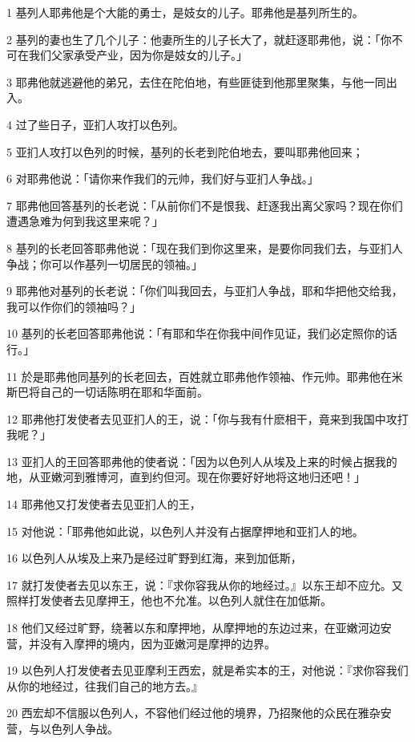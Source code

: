 \par 1 基列人耶弗他是个大能的勇士，是妓女的儿子。耶弗他是基列所生的。
\par 2 基列的妻也生了几个儿子：他妻所生的儿子长大了，就赶逐耶弗他，说：「你不可在我们父家承受产业，因为你是妓女的儿子。」
\par 3 耶弗他就逃避他的弟兄，去住在陀伯地，有些匪徒到他那里聚集，与他一同出入。
\par 4 过了些日子，亚扪人攻打以色列。
\par 5 亚扪人攻打以色列的时候，基列的长老到陀伯地去，要叫耶弗他回来；
\par 6 对耶弗他说：「请你来作我们的元帅，我们好与亚扪人争战。」
\par 7 耶弗他回答基列的长老说：「从前你们不是恨我、赶逐我出离父家吗？现在你们遭遇急难为何到我这里来呢？」
\par 8 基列的长老回答耶弗他说：「现在我们到你这里来，是要你同我们去，与亚扪人争战；你可以作基列一切居民的领袖。」
\par 9 耶弗他对基列的长老说：「你们叫我回去，与亚扪人争战，耶和华把他交给我，我可以作你们的领袖吗？」
\par 10 基列的长老回答耶弗他说：「有耶和华在你我中间作见证，我们必定照你的话行。」
\par 11 於是耶弗他同基列的长老回去，百姓就立耶弗他作领袖、作元帅。耶弗他在米斯巴将自己的一切话陈明在耶和华面前。
\par 12 耶弗他打发使者去见亚扪人的王，说：「你与我有什麽相干，竟来到我国中攻打我呢？」
\par 13 亚扪人的王回答耶弗他的使者说：「因为以色列人从埃及上来的时候占据我的地，从亚嫩河到雅博河，直到约但河。现在你要好好地将这地归还吧！」
\par 14 耶弗他又打发使者去见亚扪人的王，
\par 15 对他说：「耶弗他如此说，以色列人并没有占据摩押地和亚扪人的地。
\par 16 以色列人从埃及上来乃是经过旷野到红海，来到加低斯，
\par 17 就打发使者去见以东王，说：『求你容我从你的地经过。』以东王却不应允。又照样打发使者去见摩押王，他也不允准。以色列人就住在加低斯。
\par 18 他们又经过旷野，绕著以东和摩押地，从摩押地的东边过来，在亚嫩河边安营，并没有入摩押的境内，因为亚嫩河是摩押的边界。
\par 19 以色列人打发使者去见亚摩利王西宏，就是希实本的王，对他说：『求你容我们从你的地经过，往我们自己的地方去。』
\par 20 西宏却不信服以色列人，不容他们经过他的境界，乃招聚他的众民在雅杂安营，与以色列人争战。

